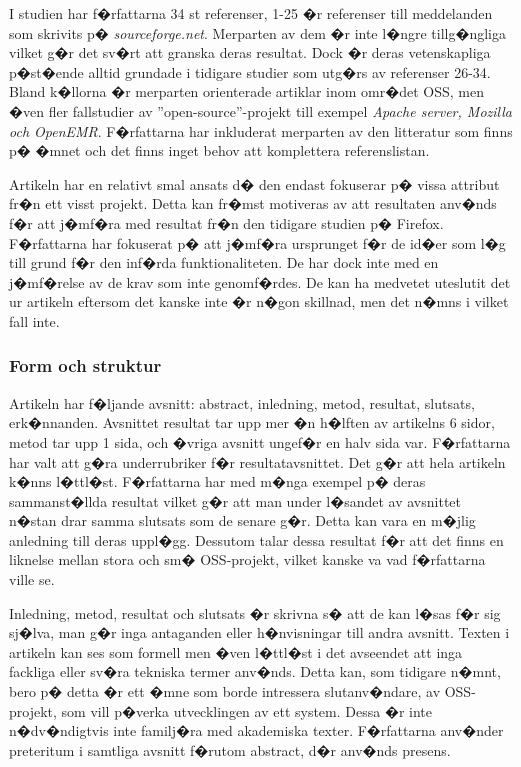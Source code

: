 \documentclass[11pt, oneside]{article}   	%
\begin{document}
I studien har f�rfattarna 34 st referenser, 1-25 �r referenser till meddelanden som skrivits p� \emph{sourceforge.net}. Merparten av dem �r inte l�ngre tillg�ngliga vilket g�r det sv�rt att granska deras resultat. Dock �r deras vetenskapliga p�st�ende alltid grundade i tidigare studier som utg�rs av referenser 26-34. Bland k�llorna �r merparten orienterade artiklar inom omr�det OSS, men �ven fler fallstudier av ''open-source''-projekt till exempel \emph{Apache server, Mozilla och OpenEMR}. F�rfattarna har inkluderat merparten av den litteratur som finns p� �mnet och det finns inget behov att komplettera referenslistan.

Artikeln har en relativt smal ansats d� den endast fokuserar p� vissa attribut fr�n ett visst projekt. Detta kan fr�mst motiveras av att resultaten anv�nds f�r att j�mf�ra med resultat fr�n den tidigare studien p� Firefox\cite{Noll2008}. F�rfattarna har fokuserat p� att j�mf�ra ursprunget f�r de id�er som l�g till grund f�r den inf�rda funktionaliteten. De har dock inte med en j�mf�relse av de krav som inte genomf�rdes. De kan ha medvetet uteslutit det ur artikeln eftersom det kanske inte �r n�gon skillnad, men det n�mns i vilket fall inte.

\subsubsection{Form och struktur}

Artikeln har f�ljande avsnitt: abstract, inledning, metod, resultat, slutsats, erk�nnanden. Avsnittet resultat tar upp mer �n h�lften av artikelns 6 sidor, metod tar upp 1 sida, och �vriga avsnitt ungef�r en halv sida var. F�rfattarna har valt att g�ra underrubriker f�r resultatavsnittet. Det g�r att hela artikeln k�nns l�ttl�st. F�rfattarna har med m�nga exempel p� deras sammanst�llda resultat vilket g�r att man under l�sandet av avsnittet n�stan drar samma slutsats som de senare g�r. Detta kan vara en m�jlig anledning till deras uppl�gg. Dessutom talar dessa resultat f�r att det finns en liknelse mellan stora och sm� OSS-projekt, vilket kanske va vad f�rfattarna ville se.

Inledning, metod, resultat och slutsats �r skrivna s� att de kan l�sas f�r sig sj�lva, man g�r inga antaganden eller h�nvisningar till andra avsnitt. Texten i artikeln kan ses som formell men �ven l�ttl�st i det avseendet att inga fackliga eller sv�ra tekniska termer anv�nds. Detta kan, som tidigare n�mnt, bero p� detta �r ett �mne som borde intressera slutanv�ndare, av OSS-projekt, som vill p�verka utvecklingen av ett system. Dessa �r inte n�dv�ndigtvis inte familj�ra med akademiska texter. F�rfattarna anv�nder preteritum i samtliga avsnitt f�rutom abstract, d�r anv�nds presens.
\end{document}
